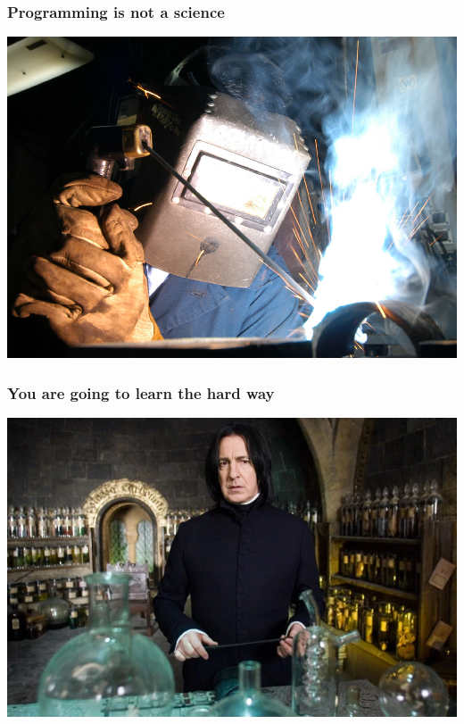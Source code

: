 \documentclass[10pt]{beamer}
\begin{document}
\begin{frame}
  \frametitle{Programming is \textbf{not} a science}

  \centering
  \includegraphics[width=\textwidth]{welding.jpg}
\end{frame}


{
\begin{frame}
  \frametitle{\color{white} You are going to learn the \textbf{hard} way}

  \centering
  \includegraphics[width=\textwidth]{severus.jpg}
\end{frame}
}

\end{document}
